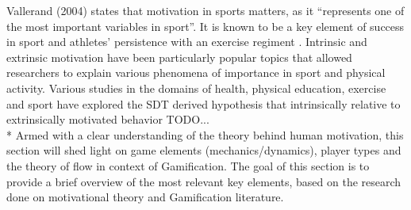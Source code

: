 Vallerand (2004) states that motivation in sports matters, as it ``represents one of the most important variables in sport''. It is known to be a key element of success in sport and athletes' persistence with an exercise regiment \cite{vallerand2007intrinsic}. Intrinsic and extrinsic motivation have been particularly popular topics that allowed researchers to explain various phenomena of importance in sport and physical activity. Various studies in the domains of health, physical education, exercise and sport have explored the SDT derived hypothesis that intrinsically relative to extrinsically motivated behavior  
TODO...\\*
Armed with a clear understanding of the theory behind human motivation, this section will shed light on game elements (mechanics/dynamics), player types and the theory of flow in context of Gamification. The goal of this section is to provide a brief overview of the most relevant key elements, based on the research done on motivational theory and Gamification literature.
